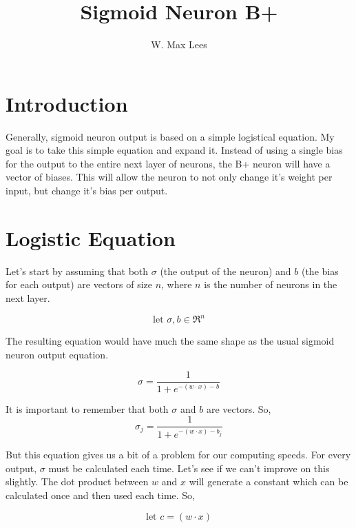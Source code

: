 \documentclass[10pt]{article}
\begin{document}
\title{Sigmoid Neuron B+}
\author{W. Max Lees}

\maketitle

\section{Introduction}
Generally, sigmoid neuron output is based on a simple logistical equation. My goal is to take this simple equation and expand it. Instead of using a single bias for the output to the entire next layer of neurons, the B+ neuron will have a vector of biases. This will allow the neuron to not only change it's weight per input, but change it's bias per output.


\section{Logistic Equation}
Let's start by assuming that both $\sigma$ (the output of the neuron) and $b$ (the bias for each output) are vectors of size $n$, where $n$ is the number of neurons in the next layer.

\begin{equation}
\text{let } \sigma, b \in \Re^{n}
\end{equation}

The resulting equation would have much the same shape as the usual sigmoid neuron output equation.

\begin{equation}
\sigma = \frac {1} {1+e^{-(w \cdot x) - b}}
\end{equation}

It is important to remember that both $\sigma$ and $b$ are vectors. So,
\begin{equation}
\sigma _{j} = \frac {1} {1+e^{-(w \cdot x) - b_{j}}}
\end{equation}

But this equation gives us a bit of a problem for our computing speeds. For every output, $\sigma$ must be calculated each time. Let's see if we can't improve on this slightly. The dot product between $w$ and $x$ will generate a constant which can be calculated once and then used each time. So,

\begin{equation}
\text{let } c = (w \cdot x)
\end{equation}
\end{document}
